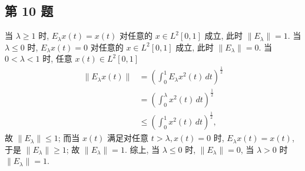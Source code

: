 \documentclass[../main.tex]{subfiles}
\begin{document}
\subsection{第 10 题}
当 $\lambda \geqslant 1$ 时, $E_{\lambda} x(t) = x(t)$ 对任意的 $x \in L^2[0, 1]$ 成立, 此时 $\| E_{\lambda} \| = 1$.
当 $\lambda \leqslant 0$ 时, $E_{\lambda} x(t) = 0$ 对任意的 $x \in L^2[0, 1]$ 成立, 此时 $\| E_{\lambda} \| = 0$. 
当 $ 0 < \lambda < 1$ 时, 任意 $x(t) \in L^2[0, 1]$
\begin{align*}
    \| E_{\lambda} x(t) \| &= \left( \int_0^1 E_{\lambda} x^2(t) \, dt \right)^{\frac{1}{2}} \\
                           &= \left(\int_0^{\lambda} x^2(t) \, dt \right)^{\frac{1}{2}} \\
                           &\leqslant \left( \int_0^1 x^2(t) \, dt \right)^{\frac{1}{2}},
\end{align*}
故 $\| E_{\lambda} \| \leqslant 1$;
而当 $x(t)$ 满足对任意 $t > \lambda, x(t) = 0$ 时, $E_{\lambda} x(t) = x(t)$, 于是 $\| E_{\lambda} \| \geqslant 1$;
故 $\| E_{\lambda} \| = 1$.
综上, 当 $\lambda \leqslant 0$ 时, $\| E_{\lambda} \| = 0$, 当 $\lambda > 0$ 时 $\| E_{\lambda} \| = 1$.
\end{document}
